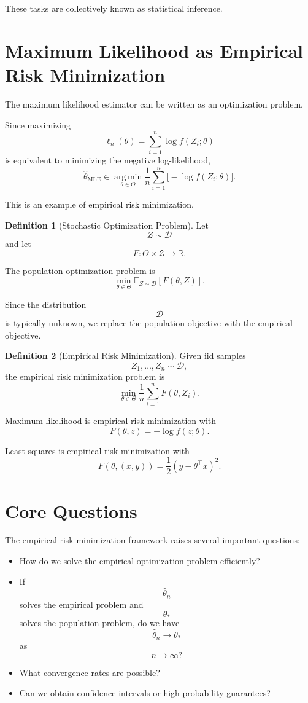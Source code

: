 \documentclass[12pt,oneside]{book}
\numberwithin{equation}{section}
\theoremstyle{definition}
\newtheorem{definition}{Definition}[section]
\theoremstyle{plain}
\theoremstyle{remark}
\newcommand{\R}{\mathbb{R}}
\newcommand{\E}{\mathbb{E}}
\newcommand{\argmin}{\operatorname*{arg\,min}}
\begin{document}
These tasks are collectively known as statistical inference.

\section{Maximum Likelihood as Empirical Risk Minimization}

The maximum likelihood estimator can be written as an optimization problem.

Since maximizing
\[
\ell_n(\theta)
=
\sum_{i=1}^n \log f(Z_i;\theta)
\]
is equivalent to minimizing the negative log-likelihood,
\[
\widehat{\theta}_{\mathrm{MLE}}
\in
\argmin_{\theta\in\Theta}
\frac{1}{n}
\sum_{i=1}^n
\bigl[-\log f(Z_i;\theta)\bigr].
\]

This is an example of empirical risk minimization.

\begin{definition}[Stochastic Optimization Problem]
Let
\[
Z\sim \mathcal{D}
\]
and let
\[
F:\Theta\times\mathcal{Z}\to\R.
\]

The population optimization problem is
\[
\min_{\theta\in\Theta}
\E_{Z\sim\mathcal{D}}[F(\theta,Z)].
\]
\end{definition}

Since the distribution
\[
\mathcal{D}
\]
is typically unknown, we replace the population objective with the empirical objective.

\begin{definition}[Empirical Risk Minimization]
Given iid samples
\[
Z_1,\dots,Z_n\sim\mathcal{D},
\]
the empirical risk minimization problem is
\[
\min_{\theta\in\Theta}
\frac{1}{n}
\sum_{i=1}^n F(\theta,Z_i).
\]
\end{definition}

Maximum likelihood is empirical risk minimization with
\[
F(\theta,z)
=
-\log f(z;\theta).
\]

Least squares is empirical risk minimization with
\[
F(\theta,(x,y))
=
\frac{1}{2}(y-\theta^\top x)^2.
\]

\section{Core Questions}

The empirical risk minimization framework raises several important questions:

\begin{itemize}
\item How do we solve the empirical optimization problem efficiently?
\item If
\[
\widehat{\theta}_n
\]
solves the empirical problem and
\[
\theta_*
\]
solves the population problem, do we have
\[
\widehat{\theta}_n\to\theta_*
\]
as
\[
n\to\infty?
\]
\item What convergence rates are possible?
\item Can we obtain confidence intervals or high-probability guarantees?
\end{itemize}
\end{document}
